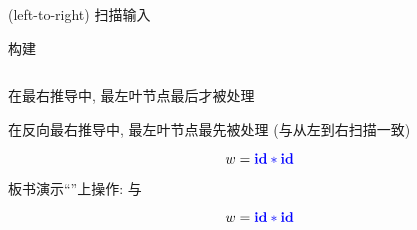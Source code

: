 \begin{frame}{}
  \begin{center}
    {\large {}}

    \vspace{0.80cm}
    \begin{columns}
        \begin{description}
          \setlength{\itemsep}{15pt}
          \item[$L:$]  (left-to-right) 扫描输入
          \item[$R:$] 构建
        \end{description}
    \end{columns}

    \vspace{0.80cm}
    在最右推导中, 最左叶节点最后才被处理

    \vspace{0.50cm}
    在反向最右推导中, 最左叶节点最先被处理 (与从左到右扫描一致)
  \end{center}
\end{frame}

%     

\begin{frame}{}
  \begin{center}
    
    \[
      w = \textcolor{blue}{\text{\bf id} \ast \text{\bf id}}
    \]
  \end{center}
\end{frame}

\begin{frame}{}
  \begin{center}
    板书演示``''上操作: 与

    \vspace{-0.30cm}
    \[
      w = \textcolor{blue}{\text{\bf id} \ast \text{\bf id}}
    \]
  \end{center}
\end{frame}

